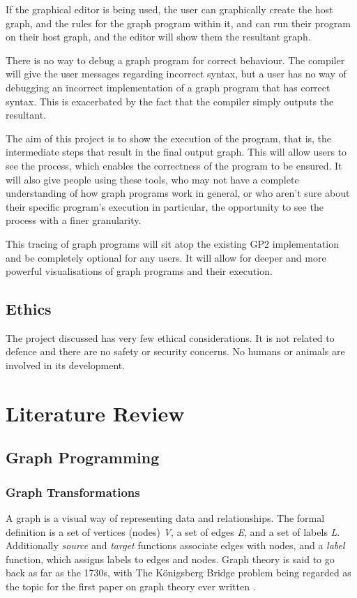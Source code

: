\documentclass{UoYCSproject}
\begin{document}
If the graphical editor is being used, the user can graphically create the host graph, and the rules for the graph program within it, and can run their program on their host graph, and the editor will show them the resultant graph.

There is no way to debug a graph program for correct behaviour. The compiler will give the user messages regarding incorrect syntax, but a user has no way of debugging an incorrect implementation of a graph program that has correct syntax. This is exacerbated by the fact that the compiler simply outputs the resultant.

The aim of this project is to show the execution of the program, that is, the intermediate steps that result in the final output graph. This will allow users to see the process, which enables the correctness of the program to be ensured. It will also give people using these tools, who may not have a complete understanding of how graph programs work in general, or who aren't sure about their specific program's execution in particular, the opportunity to see the process with a finer granularity.

This tracing of graph programs will sit atop the existing GP2 implementation and be completely optional for any users. It will allow for deeper and more powerful visualisations of graph programs and their execution.
%

\section{Ethics}
The project discussed has very few ethical considerations. It is not related to defence and there are no safety or security concerns. No humans or animals are involved in its development.

\chapter{Literature Review}
\section{Graph Programming}

\subsection{Graph Transformations}
A graph is a visual way of representing data and relationships. The formal definition is a set of vertices (nodes) \emph{V}, a set of edges \emph{E}, and a set of labels \emph{L}. Additionally \emph{source} and \emph{target} functions associate edges with nodes, and a \emph{label} function, which assigns labels to edges and nodes.
Graph theory is said to go back as far as the 1730s, with The K{\"o}nigsberg Bridge problem being regarded as the topic for the first paper on graph theory ever written \cite{grathe_origin}. 
\end{document}
